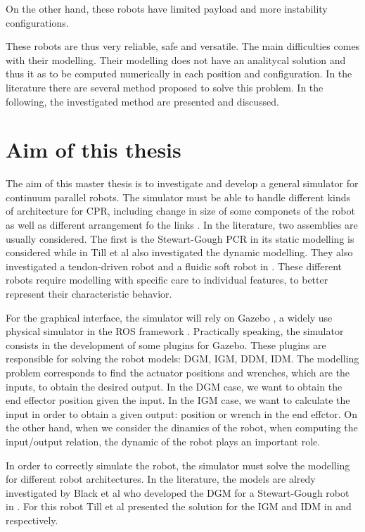 \documentclass{thesisreport}
\begin{document}
 On the other hand, these robots have limited payload and more instability configurations.
 
 These robots are thus very reliable, safe and versatile. The main difficulties comes with their modelling. Their modelling does not have an analitycal solution and thus it as to be computed numerically in each position and configuration. In the literature there are several method proposed to solve this problem. In the following, the investigated method are presented and discussed.
 
 \section{Aim of this thesis}
 The aim of this master thesis is to investigate and develop a general simulator for continuum parallel robots. The simulator must be able to handle different kinds of architecture for CPR, including change in size of some componets of the robot as well as different arrangement fo the links \cite{bryson_toward_2014}. In the literature, two assemblies are usually considered. The first is the Stewart-Gough PCR in \cite{till_efficient_2015}\cite{black_parallel_2018} its static modelling is considered while in \cite{till_real-time_2019} Till et al also investigated the dynamic modelling. They also investigated a tendon-driven robot and a fluidic soft robot in \cite{till_real-time_2019}. These different robots require modelling with specific care to individual features, to better represent their characteristic behavior. 
 
 For the graphical interface, the simulator will rely on Gazebo \cite{koenig_design_2004}\cite{noauthor_gazebo_nodate}, a widely use physical simulator in the ROS framework \cite{noauthor_rosorg_nodate}. Practically speaking, the simulator consists in the development of some plugins for Gazebo. These plugins are responsible for solving the robot models: DGM, IGM, DDM, IDM.
  The modelling problem corresponds to find the actuator positions and wrenches, which are the inputs, to obtain the desired output. In the DGM case, we want to obtain the end effector position given the input. In the IGM case, we want to calculate the input in order to obtain a given output: position or wrench in the end effctor. On the other hand, when we consider the dinamics of the robot, when computing the input/output relation, the dynamic of the robot plays an important role. 
 
 In order to correctly simulate the robot, the simulator must solve the modelling for different robot architectures. In the literature, the models are alredy investigated by Black et al who developed the DGM for a Stewart-Gough robot in \cite{black_parallel_2018}. For this robot Till et al presented the solution for the IGM and IDM in \cite{till_real-time_2019} and \cite{till_efficient_2015} respectively.
 
\end{document}
